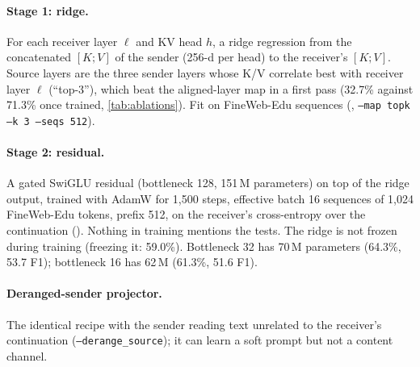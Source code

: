 \documentclass[11pt,a4paper]{report}
\begin{document}
\paragraph{Stage 1: ridge.} For each receiver layer $\ell$ and KV head $h$, a ridge regression from the concatenated $[K;V]$ of the sender (256-d per head) to the receiver's $[K;V]$. Source layers are the three sender layers whose K/V correlate best with receiver layer $\ell$ (``top-3''), which beat the aligned-layer map in a first pass (32.7\% against 71.3\% once trained, \cref{tab:ablations}). Fit on FineWeb-Edu sequences (, \texttt{--map topk --k 3 --seqs 512}).

\paragraph{Stage 2: residual.} A gated SwiGLU residual (bottleneck 128, 151\,M parameters) on top of the ridge output, trained with AdamW for 1,500 steps, effective batch 16 sequences of 1,024 FineWeb-Edu tokens, prefix 512, on the receiver's cross-entropy over the continuation (). Nothing in training mentions the tests. The ridge is not frozen during training (freezing it: 59.0\%). Bottleneck 32 has 70\,M parameters (64.3\%, 53.7 F1); bottleneck 16 has 62\,M (61.3\%, 51.6 F1).

\paragraph{Deranged-sender projector.} The identical recipe with the sender reading text unrelated to the receiver's continuation (\texttt{--derange\_source}); it can learn a soft prompt but not a content channel.
\end{document}
